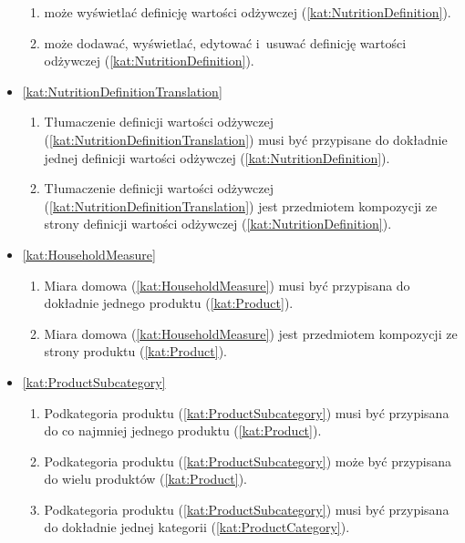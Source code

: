 \begin{itemize}[label={\textbf{Reguły dla}}, wide, labelwidth=!, labelindent=0pt]
\begin{enumerate}[label={\textbf{REG/2/\protect\twodigits{\arabic{enumi}}}}, wide, labelwidth=!, align=left, leftmargin=3cm, resume]
        \item {} może wyświetlać definicję wartości odżywczej (\ref{kat:NutritionDefinition}).
        \item {} może dodawać, wyświetlać, edytować i~usuwać definicję wartości odżywczej (\ref{kat:NutritionDefinition}).
    \end{enumerate}
    \item\ref{kat:NutritionDefinitionTranslation}\mynobreakpar
    \begin{enumerate}[label={\textbf{REG/2/\protect\twodigits{\arabic{enumi}}}}, wide, labelwidth=!, align=left, leftmargin=3cm, resume]
        \item Tłumaczenie definicji wartości odżywczej (\ref{kat:NutritionDefinitionTranslation}) musi być przypisane do dokładnie jednej definicji wartości odżywczej  (\ref{kat:NutritionDefinition}).
        \item Tłumaczenie definicji wartości odżywczej (\ref{kat:NutritionDefinitionTranslation}) jest przedmiotem kompozycji ze strony definicji wartości odżywczej (\ref{kat:NutritionDefinition}).
    \end{enumerate}
    \item\ref{kat:HouseholdMeasure}\mynobreakpar
    \begin{enumerate}[label={\textbf{REG/2/\protect\twodigits{\arabic{enumi}}}}, wide, labelwidth=!, align=left, leftmargin=3cm, resume]
        \item Miara domowa (\ref{kat:HouseholdMeasure}) musi być przypisana do dokładnie jednego produktu (\ref{kat:Product}).
        \item Miara domowa (\ref{kat:HouseholdMeasure}) jest przedmiotem kompozycji ze strony produktu (\ref{kat:Product}).
    \end{enumerate}
    \item\ref{kat:ProductSubcategory}\mynobreakpar
    \begin{enumerate}[label={\textbf{REG/2/\protect\twodigits{\arabic{enumi}}}}, wide, labelwidth=!, align=left, leftmargin=3cm, resume]
        \item Podkategoria produktu (\ref{kat:ProductSubcategory}) musi być przypisana do co najmniej jednego produktu (\ref{kat:Product}).
        \item Podkategoria produktu (\ref{kat:ProductSubcategory}) może być przypisana do wielu produktów (\ref{kat:Product}).
        \item Podkategoria produktu (\ref{kat:ProductSubcategory}) musi być przypisana do dokładnie jednej kategorii (\ref{kat:ProductCategory}).

\end{enumerate}
\end{itemize}
